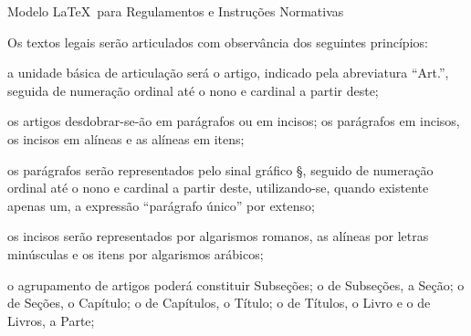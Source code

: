\documentclass[11pt,twoside,a4paper]{inifsc}
\begin{document}
\begin{normativa}{Modelo \LaTeX~para Regulamentos e Instruções Normativas}
\begin{artigo}
    \item\label{art:observancia}
    Os textos legais serão articulados com observância dos seguintes princípios:
    \begin{inciso}
        \item\label{inc:formatoartigo}
         a unidade básica de articulação será o artigo, indicado pela abreviatura ``Art.'', seguida de numeração ordinal até o nono e cardinal a partir deste;
        \item os artigos desdobrar-se-ão em parágrafos ou em incisos; os parágrafos em incisos, os incisos em alíneas e as alíneas em itens;
        \item os parágrafos serão representados pelo sinal gráfico §, seguido de numeração ordinal até o nono e cardinal a partir deste, utilizando-se, quando existente apenas um, a expressão ``parágrafo único'' por extenso;
        \item os incisos serão representados por algarismos romanos, as alíneas por letras minúsculas e os itens por algarismos arábicos;
        \item o agrupamento de artigos poderá constituir Subseções; o de Subseções, a Seção; o de Seções, o Capítulo; o de Capítulos, o Título; o de Títulos, o Livro e o de Livros, a Parte;
    \end{inciso}


\end{artigo}
\end{normativa}
\end{document}

